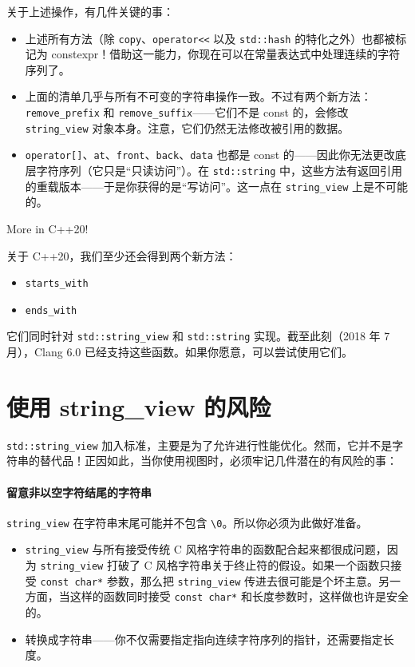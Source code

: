 关于上述操作，有几件关键的事：

\begin{itemize}
\item 上述所有方法（除 \texttt{copy}、\texttt{operator<<} 以及 \texttt{std::hash} 的特化之外）也都被标记为 constexpr！借助这一能力，你现在可以在常量表达式中处理连续的字符序列了。
\item 上面的清单几乎与所有不可变的字符串操作一致。不过有两个新方法：\texttt{remove\_prefix} 和 \texttt{remove\_suffix}——它们不是 const 的，会修改 \texttt{string\_view} 对象本身。注意，它们仍然无法修改被引用的数据。
\item \texttt{operator[]}、\texttt{at}、\texttt{front}、\texttt{back}、\texttt{data} 也都是 const 的——因此你无法更改底层字符序列（它只是“只读访问”）。在 \texttt{std::string} 中，这些方法有返回引用的重载版本——于是你获得的是“写访问”。这一点在 \texttt{string\_view} 上是不可能的。
\end{itemize}

\begin{myInfoBox}
More in C++20!

关于 C++20，我们至少还会得到两个新方法：

\begin{itemize}
\item \texttt{starts\_with}
\item \texttt{ends\_with}
\end{itemize}

它们同时针对 \texttt{std::string\_view} 和 \texttt{std::string} 实现。截至此刻（2018 年 7 月），Clang 6.0 已经支持这些函数。如果你愿意，可以尝试使用它们。
\end{myInfoBox}

\section{使用 string\_view 的风险}

\texttt{std::string\_view} 加入标准，主要是为了允许进行性能优化。然而，它并不是字符串的替代品！正因如此，当你使用视图时，必须牢记几件潜在的有风险的事：

\paragraph{留意非以空字符结尾的字符串}

\texttt{string\_view} 在字符串末尾可能并不包含 \texttt{\textbackslash0}。所以你必须为此做好准备。

\begin{itemize}
\item \texttt{string\_view} 与所有接受传统 C 风格字符串的函数配合起来都很成问题，因为 \texttt{string\_view} 打破了 C 风格字符串关于终止符的假设。如果一个函数只接受 \texttt{const char*} 参数，那么把 \texttt{string\_view} 传进去很可能是个坏主意。另一方面，当这样的函数同时接受 \texttt{const char*} 和长度参数时，这样做也许是安全的。
\item 转换成字符串——你不仅需要指定指向连续字符序列的指针，还需要指定长度。
\end{itemize}

